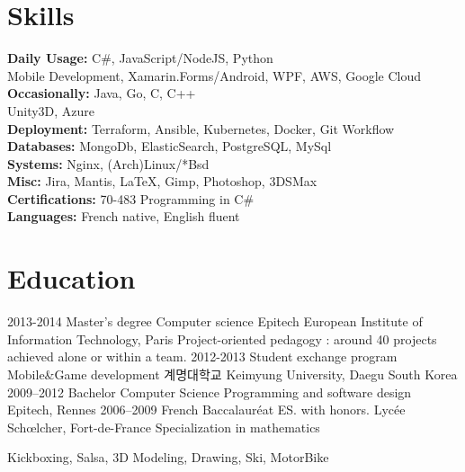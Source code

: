 \documentclass{emonides-cv}
\begin{document}
\section{Skills}
\normalsize
\textbf {Daily Usage:}   C\#, JavaScript/NodeJS, Python\\
\normalsize {  Mobile Development, Xamarin.Forms/Android, WPF, AWS, Google Cloud}\\
\textbf {Occasionally:} Java, Go, C, C++ \\
Unity3D, Azure\\
\textbf {Deployment:} Terraform, Ansible, Kubernetes, Docker, Git Workflow\\
\textbf {Databases:} MongoDb, ElasticSearch, PostgreSQL, MySql\\
\textbf {Systems:} Nginx, (Arch)Linux/*Bsd \\
\textbf {Misc:} Jira, Mantis, \LaTeX, Gimp, Photoshop, 3DSMax\\
\textbf { Certifications: } 70-483 Programming in C\#\\
\textbf { Languages: } French native, English fluent

\section{Education}
\begin{entrylist}
  \entrytwo
    {2013-2014}
    {Master's degree {\normalfont Computer science }}
    {Epitech European Institute of Information Technology, Paris} {Project-oriented pedagogy : around 40 projects achieved alone or within a team.}
  \entrytwo
    {2012-2013}
    {Student exchange program  {\normalfont  Mobile\&Game development }}
    { {\sffamily 계명대학교} Keimyung University, Daegu South Korea} {}
  \entrytwo
    {2009–2012}
    {Bachelor  {\normalfont Computer Science Programming and software design}}
    {Epitech, Rennes} {}
  \entry
    {2006–2009}
    {French Baccalauréat ES. {\normalfont with honors. }}
    {Lycée Schœlcher, Fort-de-France} { Specialization in mathematics }
\end{entrylist}
\normalsize Kickboxing, Salsa, 3D Modeling, Drawing, Ski, MotorBike
\end{document}
